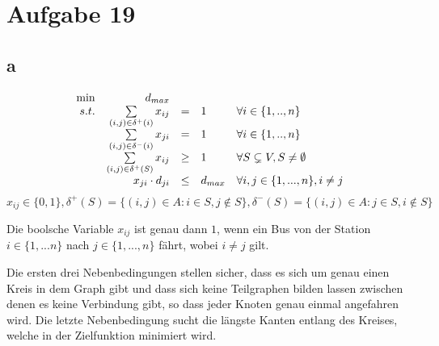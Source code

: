 \documentclass[10pt]{article}
\begin{document}
  \section*{Aufgabe 19}
    \subsection*{a}
      \begin{displaymath}
        \begin{array}{ r r c l l }
          \min & d_{max} & & & \\
          s.t. & \sum\limits_{(i,j)\in \delta^{+}(i)} x_{ij} & = & 1 & \forall 
            i\in \{1,..,n\}\\
               & \sum\limits_{(i,j)\in \delta^{-}(i)} x_{ji} & = & 1 & \forall 
            i\in \{1,..,n\}\\
            & \sum\limits_{(i,j)\in \delta^{+}(S)} x_{ij} & \geq &  1 & \forall
            S\subsetneq V, S\neq \emptyset \\
               & x_{ji}\cdot d_{ji} &\leq& d_{max} & \forall i,j \in
            \{1,...,n\}, i\neq j \\
        \end{array}
      \end{displaymath}
      \begin{displaymath}
        x_{ij}\in\{0,1\}, \delta^{+}(S)=\{(i,j)\in A:i\in S, j\not\in S\},
        \delta^{-}(S)=\{(i,j)\in A:j\in S, i\not\in S\}
      \end{displaymath}

      Die boolsche Variable $x_{ij}$ ist genau dann $1$, wenn ein Bus von der
      Station $i\in \{1,...n\}$ nach $j \in \{1,...,n\}$ fährt, wobei $i\neq j$
      gilt.


      Die ersten drei Nebenbedingungen stellen sicher, dass es sich um genau
      einen Kreis in dem Graph gibt und dass sich keine Teilgraphen bilden
      lassen zwischen denen es keine Verbindung gibt, so dass jeder Knoten genau
      einmal angefahren wird.
      Die letzte Nebenbedingung sucht die längste Kanten entlang des Kreises,
      welche in der Zielfunktion minimiert wird.
\end{document}
